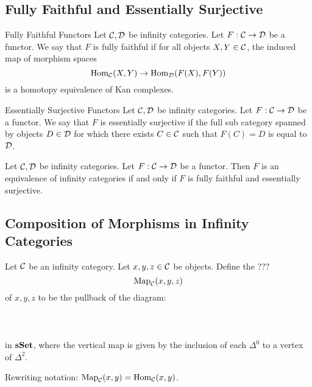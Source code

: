 \documentclass[a4paper]{article}
\begin{document}
\subsection{Fully Faithful and Essentially Surjective}
\begin{defn}{Fully Faithful Functors}{} Let $\mathcal{C},\mathcal{D}$ be infinity categories. Let $F:\mathcal{C}\to\mathcal{D}$ be a functor. We say that $F$ is fully faithful if for all objects $X,Y\in\mathcal{C}$, the induced map of morphism spaces $$\operatorname{Hom}_{\mathcal{C}}(X,Y)\to\operatorname{Hom}_{\mathcal{D}}(F(X),F(Y))$$ is a homotopy equivalence of Kan complexes. 
\end{defn}

\begin{defn}{Essentially Surjective Functors}{} Let $\mathcal{C},\mathcal{D}$ be infinity categories. Let $F:\mathcal{C}\to\mathcal{D}$ be a functor. We say that $F$ is essentially surjective if the full sub category spanned by objects $D\in\mathcal{D}$ for which there exists $C\in\mathcal{C}$ such that $F(C)=D$ is equal to $\mathcal{D}$. 
\end{defn}

\begin{prp}{}{} Let $\mathcal{C},\mathcal{D}$ be infinity categories. Let $F:\mathcal{C}\to\mathcal{D}$ be a functor. Then $F$ is an equivalence of infinity categories if and only if $F$ is fully faithful and essentially surjective. 
\end{prp}

\subsection{Composition of Morphisms in Infinity Categories}
\begin{defn}{}{} Let $\mathcal{C}$ be an infinity category. Let $x,y,z\in\mathcal{C}$ be objects. Define the ??? $$\text{Map}_{\mathcal{C}}(x,y,z)$$ of $x,y,z$ to be the pullback of the diagram: \\~\\
\\~\\
in $\bold{sSet}$, where the vertical map is given by the inclusion of each $\Delta^0$ to a vertex of $\Delta^2$. 
\end{defn}

Rewriting notation: $\text{Map}_{\mathcal{C}}(x,y)=\operatorname{Hom}_{\mathcal{C}}(x,y)$. 
\end{document}
